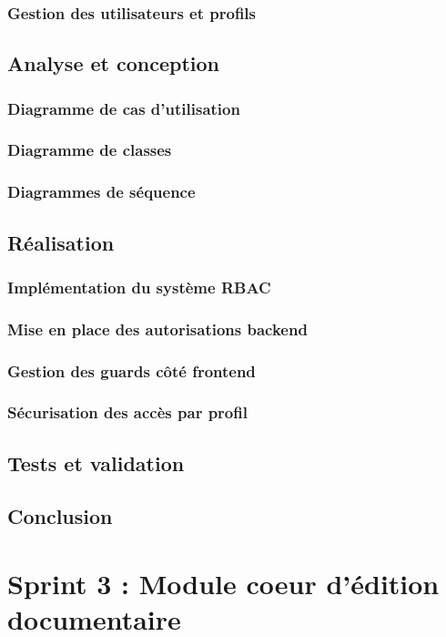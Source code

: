 \documentclass[12pt,a4paper]{report}
\begin{document}
\subsection{Gestion des utilisateurs et profils}
\section{Analyse et conception}
\subsection{Diagramme de cas d'utilisation}
\subsection{Diagramme de classes}
\subsection{Diagrammes de séquence}
\section{Réalisation}
\subsection{Implémentation du système RBAC}
\subsection{Mise en place des autorisations backend}
\subsection{Gestion des guards côté frontend}
\subsection{Sécurisation des accès par profil}
\section{Tests et validation}
\section{Conclusion}


\chapter{Sprint 3 : Module coeur d'édition documentaire}
\end{document}

